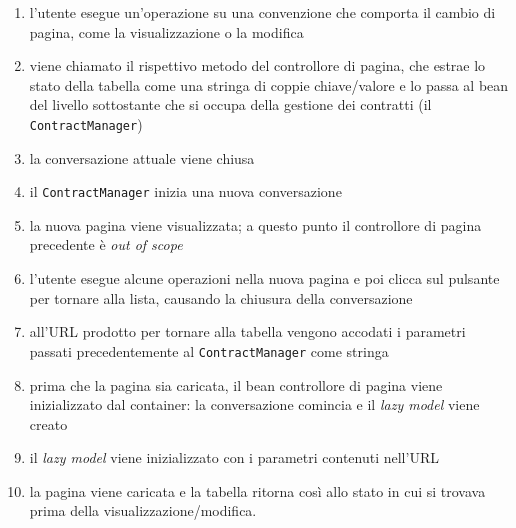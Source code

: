 \begin{enumerate}
\item l'utente esegue un'operazione su una convenzione che comporta il cambio di pagina, come la visualizzazione o la modifica
\item viene chiamato il rispettivo metodo del controllore di pagina, che estrae lo stato della tabella come una stringa di coppie chiave/valore e lo passa al bean del livello sottostante che si occupa della gestione dei contratti (il \lstinline{ContractManager})
\item la conversazione attuale viene chiusa
\item il \lstinline{ContractManager} inizia una nuova conversazione
\item la nuova pagina viene visualizzata; a questo punto il controllore di pagina precedente è \textit{out of scope}
\item l'utente esegue alcune operazioni nella nuova pagina e poi clicca sul pulsante per tornare alla lista, causando la chiusura della conversazione
\item all'URL prodotto per tornare alla tabella vengono accodati i parametri passati precedentemente al \lstinline{ContractManager} come stringa
\item prima che la pagina sia caricata, il bean controllore di pagina viene inizializzato dal container: la conversazione comincia e il \textit{lazy model} viene creato
\item il \textit{lazy model} viene inizializzato con i parametri contenuti nell'URL
\item la pagina viene caricata e la tabella ritorna così allo stato in cui si trovava prima della visualizzazione/modifica.
\end{enumerate}